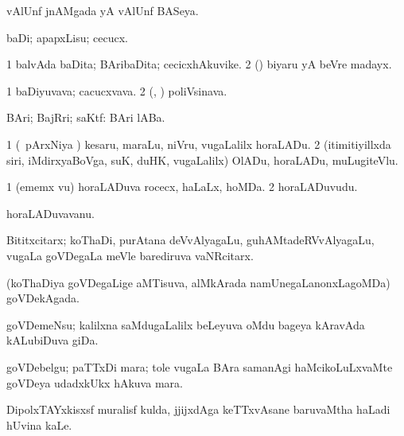{\bentry
{} 
\gl{\gu}
\expl{}
\bmng
vAlUnf jnAMgada yA vAlUnf BASeya. 
\emng
\eentry

\bentry
{} 
\gl{\sakirx}
\bmng
baDi; apapxLisu; cecucx. 
\emng
\eentry

\bentry
{} 
\gl{\nA}
\expl{}
\bmng
\bnum
\num{1} balvAda baDita; BAribaDita; cecicxhAkuvike. 
\num{2} (\birx) biyaru yA beVre madayx. 
\enum
\emng
\eentry

\bentry
{} 
\gl{\nA}
\bmng
\bnum
\num{1} baDiyuvava; cacucxvava. 
\num{2} (\AseTxrXV, \ashi) poliVsinava. 
\enum
\emng
\eentry

\bentry
{} 
\gl{\gu}
\expl{}
\bmng
BAri; BajRri; saKtf:  BAri lABa. 
\emng
\eentry

\bentry
{} 
\gl{\akirx}
\expl{}
\bmng
\bnum
\num{1} (\kanmu\ pArxNiya \vi) kesaru, maraLu, niVru, \mo vugaLalilx horaLADu. 
\num{2} (itimitiyillxda siri, iMdirxyaBoVga, suK, duHK, \mo vugaLalilx) OlADu, horaLADu, muLugiteVlu. 
\enum
\emng
\eentry

\bentry
{} 
\gl{\nA}
\expl{}
\bmng
\bnum
\num{1} (ememx \mo vu) horaLADuva rocecx, haLaLx, hoMDa. 
\num{2} horaLADuvudu. 
\enum
\emng
\eentry

\bentry
{} 
\gl{\nA}
\expl{}
\bmng
horaLADuvavanu. 
\emng
\eentry

\bentry
{} 
\gl{\nA}
\expl{}
\bmng
Bititxcitarx; koThaDi, purAtana deVvAlyagaLu, guhAMtadeRVvAlyagaLu, \mo vugaLa goVDegaLa meVle barediruva vaNRcitarx. 
\emng
\eentry

\bentry
{} 
\gl{\nA}
\expl{}
\bmng
(koThaDiya goVDegaLige aMTisuva, alMkArada namUnegaLanonxLagoMDa) goVDekAgada. 
\emng
\eentry

\bentry
{} 
\gl{\nA}
\expl{}
\bmng
goVDemeNsu; kalilxna saMdugaLalilx beLeyuva oMdu bageya kAravAda kALubiDuva giDa. 
\emng
\eentry

\bentry
{} 
\gl{\nA}
\expl{}
\bmng
goVDebelgu; paTTxDi mara; tole \mo vugaLa BAra samanAgi haMcikoLuLxvaMte goVDeya udadxkUkx hAkuva mara. 
\emng
\eentry

\bentry
{} 
\gl{\nA}
\bmng
DipolxTAYxkisxsf muralisf kulda, jjijxdAga keTTxvAsane baruvaMtha haLadi hUvina kaLe. 
\emng
\eentry

}
